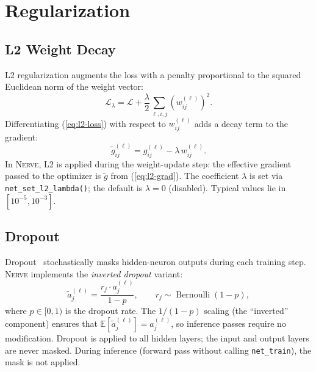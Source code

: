 \documentclass[11pt,a4paper]{article}
\newcommand{\nerve}{\textsc{Nerve}}
\begin{document}
\section{Regularization}
\label{sec:reg}

\subsection{L2 Weight Decay}

L2 regularization augments the loss with a penalty proportional to the
squared Euclidean norm of the weight vector:
\begin{equation}
  \mathcal{L}_\lambda = \mathcal{L}
    + \frac{\lambda}{2}\sum_{\ell,i,j}\left(w_{ij}^{(\ell)}\right)^2.
  \label{eq:l2-loss}
\end{equation}
Differentiating (\ref{eq:l2-loss}) with respect to $w_{ij}^{(\ell)}$ adds
a decay term to the gradient:
\begin{equation}
  \tilde{g}_{ij}^{(\ell)}
    = g_{ij}^{(\ell)} - \lambda\,w_{ij}^{(\ell)}.
  \label{eq:l2-grad}
\end{equation}
In \nerve{}, L2 is applied during the weight-update step:
the effective gradient passed to the optimizer is $\tilde{g}$ from
(\ref{eq:l2-grad}). The coefficient $\lambda$ is set via
\texttt{net\_set\_l2\_lambda()}; the default is $\lambda=0$
(disabled). Typical values lie in $[10^{-5}, 10^{-3}]$.

\subsection{Dropout}
\label{sec:dropout}

Dropout~\cite{srivastava2014} stochastically masks hidden-neuron
outputs during each training step. \nerve{} implements the
\emph{inverted dropout} variant:
\begin{equation}
  \tilde{a}_j^{(\ell)}
    = \frac{r_j \cdot a_j^{(\ell)}}{1 - p},
  \qquad r_j \sim \operatorname{Bernoulli}(1-p),
  \label{eq:dropout}
\end{equation}
where $p \in [0,1)$ is the dropout rate. The $1/(1-p)$ scaling (the
``inverted'' component) ensures that $\mathbb{E}[\tilde{a}_j^{(\ell)}]
= a_j^{(\ell)}$, so inference passes require no modification.
Dropout is applied to all hidden layers; the input and output layers are
never masked. During inference (forward pass without calling
\texttt{net\_train}), the mask is not applied.
\end{document}
